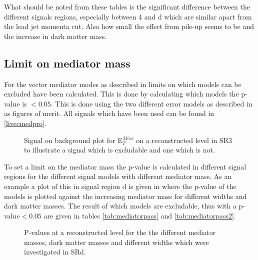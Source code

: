 What should be noted from these tables is the significant difference between the different signals regions, especially between 4 and d which are similar apart from the lead jet momenta cut. Also how small the effect from pile-up seems to be and the increase in dark matter mass.

\newpage
\subsection{Limit on mediator mass}\label{sec:res:subsec:Mm}
For the vector mediator modes as described in  limits on which models can be excluded have been calculated. This is done by calculating which models the p-value is $<0.05$. This is done using the two different error models as described in  as figures of merit. All signals which have been used can be found in \ref{livecmedpro}.


 \begin{figure}[H] %
    \hfill
    \caption{Signal on background plot for E$^{Miss}_T$ on a reconstructed level in SR3 to illustrate a signal which is excludable and one which is not. }
    \label{fig:sigback}
  \end{figure}

To set a limit on the mediator mass the p-value is calculated in different signal regions for the different signal models with different mediator mass. As an example a plot of this in signal region d is given in  where the p-value of the models is plotted against the increasing mediator mass for different widths and dark matter masses. The result of which models are excludable, thus with a p-value$<0.05$ are given in tables \ref{tab:mediatorpass} and \ref{tab:mediatorpass2}.

 \begin{figure}[H] %
    \hfill
    \caption{P-values at a reconstructed level for the the different mediator masses, dark matter masses and different widths which were investigated in SRd.}
    \label{fig:modelex}
  \end{figure}



